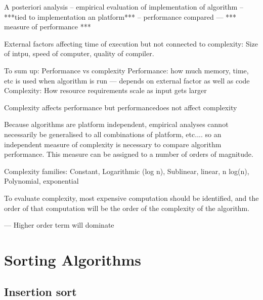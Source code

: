 \documentclass[12pt, a4paper]{article}
\begin{document}
A posteriori analysis -- empirical evaluation of implementation of  algorithm -- ***tied to implementation an platform*** -- performance compared --- *** measure of performance ***

External factors affecting time of execution but not connected to complexity:
Size of intpu, speed of computer, quality of compiler.

To sum up: Performance vs complexity
Performance: how much memory, time, etc is used when algorithm is run --- depends on external factor as well as code 
Complexity: How resource requirements scale as input gets larger

Complexity affects performance but performancedoes not affect complexity

Because algorithms are platform independent, empirical analyses cannot necessarily be generalised to all combinations of platform, etc.... so an independent measure of complexity is necessary to compare algorithm performance. This measure can be assigned to a number of orders of magnitude. 

Complexity families:
    Constant, Logarithmic (log n), Sublinear, linear, n log(n), Polynomial, exponential

To evaluate complexity, most expensive computation should be identified, and the order of that computation will be the order of the complexity of the algorithm.

--- Higher order term will dominate 
\section{Sorting Algorithms}


\subsection{Insertion sort}
\end{document}
